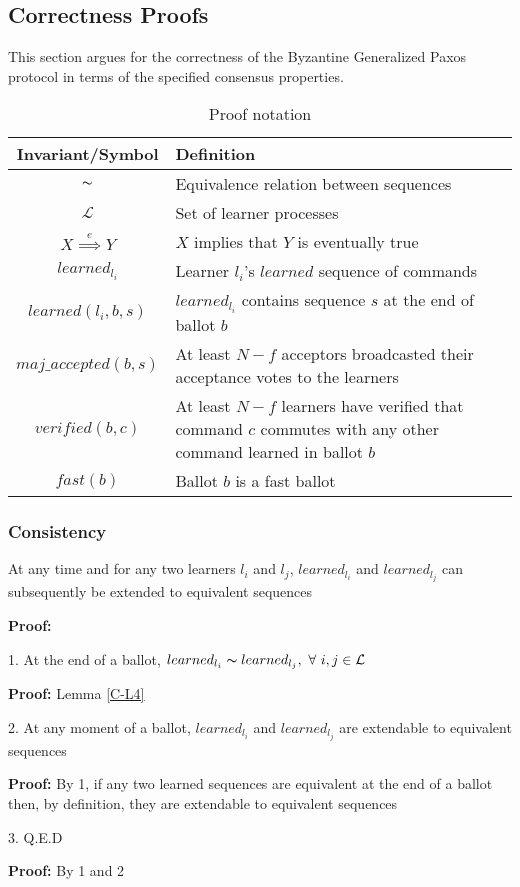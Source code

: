 \subsection{Correctness Proofs}

This section argues for the correctness of the Byzantine Generalized Paxos protocol in terms of the specified consensus properties.\par


\begin{table}[h!]
	\renewcommand{\arraystretch}{1.5}
	\centering
	\begin{tabularx}{\linewidth}{ |c|X|}
		\hline
		Invariant/Symbol & Definition \\
		\hline
		$\thicksim$ & Equivalence relation between sequences \\
		\hline
		$\mathcal{L}$ & Set of learner processes \\
		\hline
		$X \overset{e}{\implies} Y$ & $X$ implies that $Y$ is eventually true \\
		\hline
		$learned_{l_i}$ & Learner $l_i$'s $learned$ sequence of commands \\
		\hline
		$learned(l_i,b,s)$ & $learned_{l_i}$ contains sequence $s$ at the end of ballot $b$  \\
		\hline
		$maj\_accepted(b,s)$ & At least $N-f$ acceptors broadcasted their acceptance votes to the learners\\
		\hline
		$verified(b,c)$ & At least $N-f$ learners have verified that command $c$ commutes with any other command learned in ballot $b$\\
		\hline
		$fast(b)$ & Ballot $b$ is a fast ballot\\
		\hline
	\end{tabularx} 
	\caption{Proof notation} 
	\label{table:1}
\end{table}

\subsubsection{Consistency}
\begin{theorem}
At any time and for any two learners $l_i$ and $l_j$, $learned_{l_i}$ and $learned_{l_j}$ can subsequently be extended to equivalent sequences \label{C-T1}
\end{theorem} 
\textbf{Proof:} \par
1. At the end of a ballot, $learned_{l_i} \thicksim learned_{l_j},\ \forall\ i,j \in \mathcal{L}$\par
\indent\indent\textbf{Proof:} Lemma \ref{C-L4} \par
2. At any moment of a ballot, $learned_{l_i}$ and $learned_{l_j}$ are extendable to equivalent sequences \par
\indent\indent\textbf{Proof:} By 1, if any two learned sequences are equivalent at the end of a ballot then, by definition, they are extendable to equivalent sequences\par
3. Q.E.D \par
\indent\indent\textbf{Proof:} By 1 and 2\par


